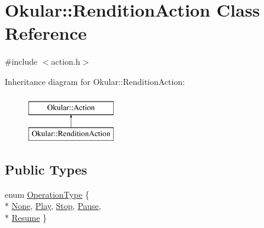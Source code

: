\hypertarget{classOkular_1_1RenditionAction}{\section{Okular\+:\+:Rendition\+Action Class Reference}
\label{classOkular_1_1RenditionAction}
}


{\ttfamily \#include $<$action.\+h$>$}

Inheritance diagram for Okular\+:\+:Rendition\+Action\+:\begin{figure}[H]
\begin{center}
\leavevmode
\includegraphics[height=2.000000cm]{classOkular_1_1RenditionAction}
\end{center}
\end{figure}
\subsection*{Public Types}
\begin{DoxyCompactItemize}
\item 
enum \hyperlink{classOkular_1_1RenditionAction_ae036a78aa4d9997df70e856410cbc1a5}{Operation\+Type} \{ \\*
\hyperlink{classOkular_1_1RenditionAction_ae036a78aa4d9997df70e856410cbc1a5ac9760ac3379976d5d440034e247f8990}{None}, 
\hyperlink{classOkular_1_1RenditionAction_ae036a78aa4d9997df70e856410cbc1a5ad64f184845ab51b85d6a2371b5000dee}{Play}, 
\hyperlink{classOkular_1_1RenditionAction_ae036a78aa4d9997df70e856410cbc1a5a79f9d68e6cbe8e0a80749b2c76657067}{Stop}, 
\hyperlink{classOkular_1_1RenditionAction_ae036a78aa4d9997df70e856410cbc1a5a8337042e5e7d0d92ca24b4b75da66e0a}{Pause}, 
\\*
\hyperlink{classOkular_1_1RenditionAction_ae036a78aa4d9997df70e856410cbc1a5aad4b6626db0d0519cd9dbd78f0d48811}{Resume}
 \}
\end{DoxyCompactItemize}
